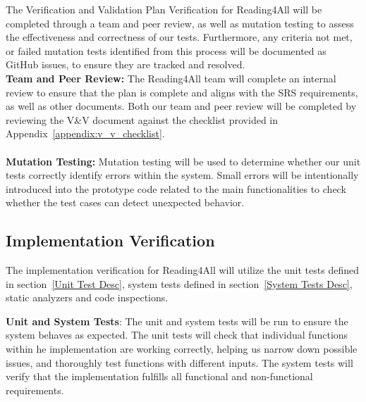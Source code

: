 \documentclass[12pt, titlepage]{article}
\begin{document}
The Verification and Validation Plan Verification for Reading4All will be completed through a team and peer review, as well as mutation testing to assess the effectiveness and correctness of our tests. 
Furthermore, any criteria not met, or failed mutation tests identified from this process will be documented as GitHub issues, to ensure they are tracked and resolved. 
\\

\textbf{Team and Peer Review:}
The Reading4All team will complete an internal review to ensure that the plan is complete and aligns with the SRS requirements, as well as other documents. 
Both our team and peer review will be completed by reviewing the V\&V document against the checklist provided in Appendix~\ref{appendix:v_v_checklist}.   \\ \\

\textbf{Mutation Testing:}
Mutation testing will be used to determine whether our unit tests correctly identify errors within the system.
Small errors will be intentionally introduced into the prototype code related to the main functionalities to check whether the test cases can detect unexpected behavior. 


\subsection{Implementation Verification}




The implementation verification for Reading4All will utilize the unit tests defined in section~\ref{Unit Test Desc}, system tests defined in section~\ref{System Tests Desc},
static analyzers and code inspections.

\textbf{Unit and System Tests}:
The unit and system tests will be run to ensure the system behaves as expected. The unit tests will check that individual functions within he implementation are working correctly, helping us narrow down possible issues, and thoroughly test functions with different inputs. 
The system tests will verify that the implementation fulfills all functional and non-functional requirements. \\
\end{document}

